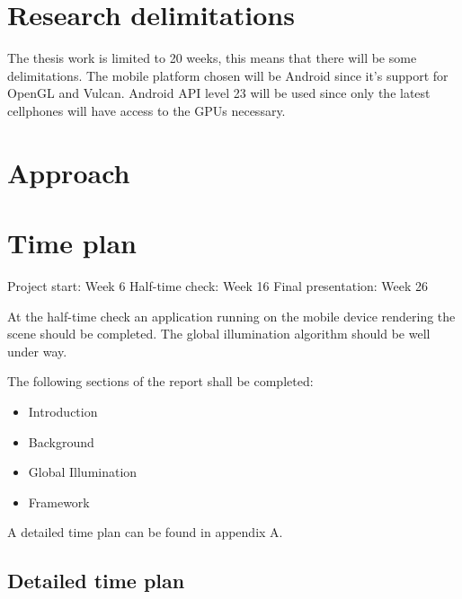 \documentclass[a4paper, 12pt]{article}
\begin{document}
\section{Research delimitations}
\label{sec:Research delimitations}

The thesis work is limited to 20 weeks, this means that there will be some delimitations.
The mobile platform chosen will be Android since it's support for OpenGL and Vulcan. Android API level 23 will be used since only the latest cellphones will have access to the GPUs necessary.

\section{Approach}
\label{sec:Approach}



\section{Time plan}
\label{sec:Time plan}

Project start: Week 6
Half-time check: Week 16
Final presentation: Week 26

At the half-time check an application running on the mobile device rendering the scene should be completed. The global illumination algorithm should be well under way.

The following sections of the report shall be completed:
\begin{itemize}
  \item Introduction
  \item Background
  \item Global Illumination
  \item Framework
\end{itemize}

A detailed time plan can be found in appendix A.




\newpage

\begin{appendices}

\section{Detailed time plan}
\label{app:timeplan}

\end{appendices}
\end{document}
